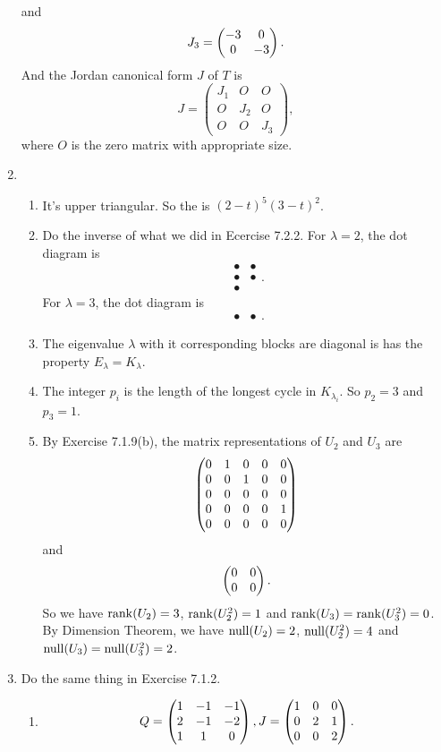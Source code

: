 \begin{enumerate}
and 
\[J_3=\begin{pmatrix}-3 & 0\cr 0 & -3\end{pmatrix}.\]
And the Jordan canonical form $J$ of $T$ is 
\[J=\begin{pmatrix}J_1&O&O\\O&J_2&O\\O&O&J_3\end{pmatrix},\]
where $O$ is the zero matrix with appropriate size.
\item \begin{enumerate}
\item It's upper triangular. So the \charpoly{} is $(2-t)^5(3-t)^2$.
\item Do the inverse of what we did in Ecercise 7.2.2. For $\lambda=2$, the dot diagram is 
\[\begin{array}{cc}\bullet &\bullet \\\bullet &\bullet \\\bullet & \end{array}.\]
For $\lambda=3$, the dot diagram is 
\[\begin{array}{cc}\bullet &\bullet \end{array}.\]
\item The eigenvalue $\lambda$ with it corresponding blocks are diagonal is has the property $E_{\lambda}=K_{\lambda}$.
\item The integer $p_i$ is the length of the longest cycle in $K_{\lambda_i}$. So $p_2=3$ and $p_3=1$.
\item By Exercise 7.1.9(b), the matrix representations of $U_2$ and $U_3$ are 
\[\begin{pmatrix}0 & 1 & 0 & 0 & 0\cr 0 & 0 & 1 & 0 & 0\cr 0 & 0 & 0 & 0 & 0\cr 0 & 0 & 0 & 0 & 1\cr 0 & 0 & 0 & 0 & 0\end{pmatrix}\]
and 
\[\begin{pmatrix}0 & 0\cr 0 & 0\end{pmatrix}.\]
So we have $\operatorname{rank}(U_2)=3$, $\operatorname{rank}(U_2^2)=1$ and $\operatorname{rank}(U_3)=\operatorname{rank}(U_3^2)=0$. By Dimension Theorem, we have $\operatorname{null}(U_2)=2$, $\operatorname{null}(U_2^2)=4$ and $\operatorname{null}(U_3)=\operatorname{null}(U_3^2)=2$.
\end{enumerate}
\item Do the same thing in Exercise 7.1.2.
\begin{enumerate}
\item 
\[Q=\begin{pmatrix}1 & -1 & -1\cr 2 & -1 & -2\cr 1 & 1 & 0\end{pmatrix},J=\begin{pmatrix}1 & 0 & 0\cr 0 & 2 & 1\cr 0 & 0 & 2\end{pmatrix}.\]

\end{enumerate}
\end{enumerate}
